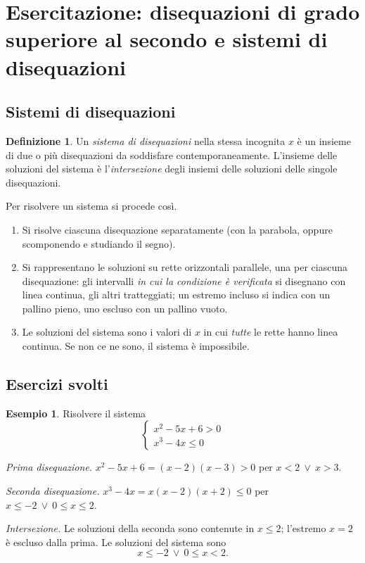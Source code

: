 \documentclass[12pt,a4paper,openany]{book}
\theoremstyle{definition}
\newtheorem{definizione}{Definizione}[section]
\newtheorem{esempio}{Esempio}[section]
\theoremstyle{plain}
\theoremstyle{remark}
\newcommand{\sistema}[1]{\begin{cases}#1\end{cases}}
\begin{document}
\section{Esercitazione: disequazioni di grado superiore al secondo e sistemi di disequazioni}

\subsection*{Sistemi di disequazioni}

\begin{definizione}
Un \emph{sistema di disequazioni} nella stessa incognita $x$ è un insieme di due o più disequazioni da soddisfare contemporaneamente. L'insieme delle soluzioni del sistema è l'\emph{intersezione} degli insiemi delle soluzioni delle singole disequazioni.
\end{definizione}

Per risolvere un sistema si procede così.
\begin{enumerate}[label=\arabic*)]
\item Si risolve ciascuna disequazione separatamente (con la parabola, oppure scomponendo e studiando il segno).
\item Si rappresentano le soluzioni su rette orizzontali parallele, una per ciascuna disequazione: gli intervalli \emph{in cui la condizione è verificata} si disegnano con linea continua, gli altri tratteggiati; un estremo incluso si indica con un pallino pieno, uno escluso con un pallino vuoto.
\item Le soluzioni del sistema sono i valori di $x$ in cui \emph{tutte} le rette hanno linea continua. Se non ce ne sono, il sistema è impossibile.
\end{enumerate}

\subsection*{Esercizi svolti}

\begin{esempio}
Risolvere il sistema
\[
\sistema{x^2-5x+6>0\\ x^3-4x\le 0}
\]

\emph{Prima disequazione.} $x^2-5x+6=(x-2)(x-3)>0$ per $x<2\ \lor\ x>3$.

\emph{Seconda disequazione.} $x^3-4x=x(x-2)(x+2)\le 0$ per $x\le -2\ \lor\ 0\le x\le 2$.

\emph{Intersezione.} Le soluzioni della seconda sono contenute in $x\le 2$; l'estremo $x=2$ è escluso dalla prima. Le soluzioni del sistema sono
\[
x\le -2\ \lor\ 0\le x<2.
\]
\end{esempio}
\end{document}
